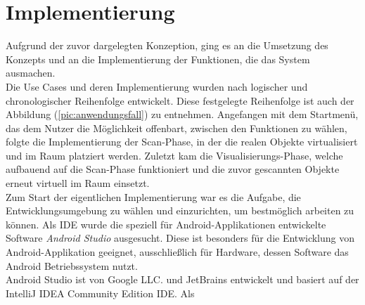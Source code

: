 \section{Implementierung}
\label{chap:implementierung}
Aufgrund der zuvor dargelegten Konzeption, ging es an die Umsetzung des Konzepts und an die Implementierung der Funktionen, die das System ausmachen. 
\\ 
Die Use Cases und deren Implementierung wurden nach logischer und chronologischer Reihenfolge entwickelt. %
Diese festgelegte Reihenfolge 
ist auch der Abbildung (\ref{pic:anwendungsfall}) zu entnehmen. Angefangen mit dem Startmenü, das dem Nutzer die Möglichkeit offenbart, zwischen den Funktionen 
zu wählen, folgte die Implementierung der Scan-Phase, in der die realen Objekte virtualisiert und im Raum platziert werden. Zuletzt kam die Visualisierungs-Phase, 
welche aufbauend auf die Scan-Phase funktioniert und die zuvor gescannten Objekte erneut virtuell im Raum einsetzt. 
\\ 
\linebreak
Zum Start der eigentlichen Implementierung war es die Aufgabe, die Entwicklungsumgebung zu wählen und einzurichten, um bestmöglich arbeiten zu können. Als 
\ac{IDE} wurde die speziell für Android-Applikationen entwickelte Software \textit{Android Studio} ausgesucht. Diese ist besonders für die Entwicklung von 
Android-Applikation geeignet, ausschließlich für Hardware, dessen Software das Android Betriebssystem nutzt. 
\\
Android Studio ist von Google LLC. und JetBrains entwickelt und basiert auf der IntelliJ IDEA Community Edition \acs{IDE}. Als 
